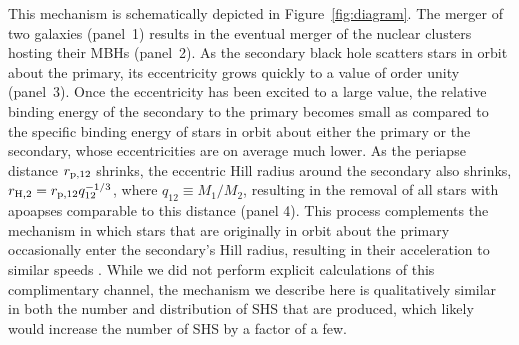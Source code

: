 \documentclass[a4paper,twocolumn]{emulateapj}
\begin{document}
{This mechanism is schematically depicted in Figure~\ref{fig:diagram}. The merger of two galaxies (panel~1) results in the eventual merger of the nuclear clusters hosting their MBHs (panel~2). As the secondary black hole scatters stars in orbit about the primary, its eccentricity grows quickly to a value of order unity (panel~3). Once the eccentricity has been excited to a large value, the relative binding energy of the secondary to the primary becomes small as compared to the specific binding energy of stars in orbit about either the primary or the secondary, whose eccentricities are on average much lower. As the periapse distance $r_{\rm p,12}$ shrinks, the eccentric Hill radius around the secondary also shrinks, $r_{\rm H,2} = r_{\rm p,12} q_{12}^{\smash{-1/3}}$, where $q_{12} \equiv M_{1}/M_{2}$, resulting in the removal of all stars with apoapses comparable to this distance (panel 4). This process complements the mechanism in which stars that are originally in orbit about the primary occasionally enter the secondary's Hill radius, resulting in their acceleration to similar speeds \citep{Yu:2003a,Holley-Bockelmann:2005a,Levin:2006a,Sesana:2006a}. While we did not perform explicit calculations of this complimentary channel, the mechanism we describe here is qualitatively similar in both the number and distribution of SHS that are produced, which likely would increase the number of SHS by a factor of a few.

}
\end{document}
